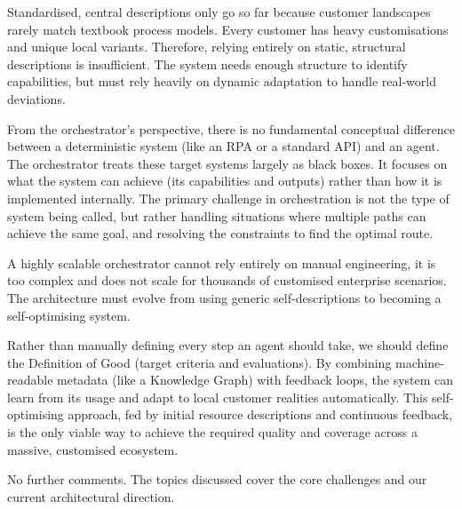 Standardised, central descriptions only go so far because customer landscapes rarely match textbook process models. Every customer has heavy customisations and unique local variants. Therefore, relying entirely on static, structural descriptions is insufficient. The system needs enough structure to identify capabilities, but must rely heavily on dynamic adaptation to handle real-world deviations.

\medskip{}

From the orchestrator's perspective, there is no fundamental conceptual difference between a deterministic system (like an RPA or a standard API) and an agent. The orchestrator treats these target systems largely as black boxes. It focuses on what the system can achieve (its capabilities and outputs) rather than how it is implemented internally. The primary challenge in orchestration is not the type of system being called, but rather handling situations where multiple paths can achieve the same goal, and resolving the constraints to find the optimal route.

\medskip{}

A highly scalable orchestrator cannot rely entirely on manual engineering, it is too complex and does not scale for thousands of customised enterprise scenarios. The architecture must evolve from using generic self-descriptions to becoming a self-optimising system.

\medskip{}

Rather than manually defining every step an agent should take, we should define the Definition of Good (target criteria and evaluations). By combining machine-readable metadata (like a Knowledge Graph) with feedback loops, the system can learn from its usage and adapt to local customer realities automatically. This self-optimising approach, fed by initial resource descriptions and continuous feedback, is the only viable way to achieve the required quality and coverage across a massive, customised ecosystem.

\medskip{}

No further comments. The topics discussed cover the core challenges and our current architectural direction.

